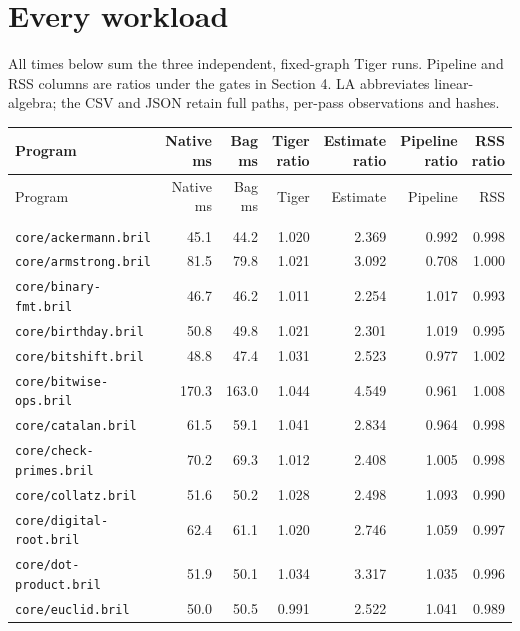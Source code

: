 \section{Every workload}
All times below sum the three independent, fixed-graph Tiger runs. Pipeline and RSS columns are ratios under the gates in Section 4. LA abbreviates linear-algebra; the CSV and JSON retain full paths, per-pass observations and hashes.
\begingroup\small\setlength{\tabcolsep}{3pt}
\begin{longtable}{p{52mm}rrrrrr}
\toprule Program & \shortstack{Native\\ms} & \shortstack{Bag\\ms} & \shortstack{Tiger\\ratio} & \shortstack{Estimate\\ratio} & \shortstack{Pipeline\\ratio} & \shortstack{RSS\\ratio}\\\midrule\endfirsthead
\toprule Program & Native ms & Bag ms & Tiger & Estimate & Pipeline & RSS\\\midrule\endhead
\bottomrule\endfoot
\multicolumn{7}{l}{\textbf{Bril}}\\*
\nolinkurl{core/ackermann.bril} & 45.1 & 44.2 & 1.020 & 2.369 & 0.992 & 0.998 \\
\nolinkurl{core/armstrong.bril} & 81.5 & 79.8 & 1.021 & 3.092 & 0.708 & 1.000 \\
\nolinkurl{core/binary-fmt.bril} & 46.7 & 46.2 & 1.011 & 2.254 & 1.017 & 0.993 \\
\nolinkurl{core/birthday.bril} & 50.8 & 49.8 & 1.021 & 2.301 & 1.019 & 0.995 \\
\nolinkurl{core/bitshift.bril} & 48.8 & 47.4 & 1.031 & 2.523 & 0.977 & 1.002 \\
\nolinkurl{core/bitwise-ops.bril} & 170.3 & 163.0 & 1.044 & 4.549 & 0.961 & 1.008 \\
\nolinkurl{core/catalan.bril} & 61.5 & 59.1 & 1.041 & 2.834 & 0.964 & 0.998 \\
\nolinkurl{core/check-primes.bril} & 70.2 & 69.3 & 1.012 & 2.408 & 1.005 & 0.998 \\
\nolinkurl{core/collatz.bril} & 51.6 & 50.2 & 1.028 & 2.498 & 1.093 & 0.990 \\
\nolinkurl{core/digital-root.bril} & 62.4 & 61.1 & 1.020 & 2.746 & 1.059 & 0.997 \\
\nolinkurl{core/dot-product.bril} & 51.9 & 50.1 & 1.034 & 3.317 & 1.035 & 0.996 \\
\nolinkurl{core/euclid.bril} & 50.0 & 50.5 & 0.991 & 2.522 & 1.041 & 0.989 \\

\end{longtable}
